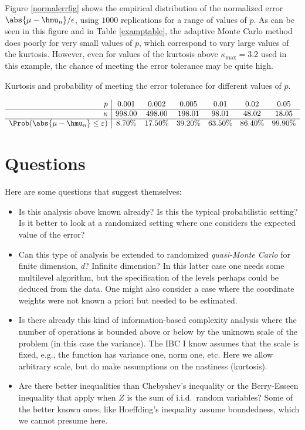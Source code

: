 \documentclass[12pt]{amsart}
\begin{document}
Figure \ref{normalerrfig} shows the empirical distribution of the normalized error $\abs{\mu-\hmu_n}/\epsilon$, using $1000$ replications for a range of values of $p$.  As can be seen in this figure and in Table \ref{examptable}, the adaptive Monte Carlo method does poorly for very small values of $p$, which correspond to vary large values of the kurtosis.  However, even for values of the kurtosis above $\kappa_{\max}=3.2$ used in this example, the chance of meeting the error tolerance may be quite high.

\begin{table}
\caption{Kurtosis and probability of meeting the error tolerance for different values of $p$. \label{examptable}}
\[
\begin{array}{r|ccccccccccc}
p &   0.001 &    0.002 &    0.005 &     0.01 &     0.02 &     0.05 \\
\hline
\kappa &  998.00 &   498.00 &   198.01 &    98.01 &    48.02 &    18.05 \\
\hline
\Prob(\abs{\mu-\hmu_n} \le \varepsilon) &    8.70\% &    17.50\% &    39.20\% &    63.50\% &    86.40\% &    99.90\% \\
\end{array}
\]
\end{table}


\section{Questions}

Here are some questions that suggest themselves:

\begin{itemize}

\item Is this analysis above known already?  Is this the typical probabilistic setting?  Is it better to look at a randomized setting where one considers the expected value of the error?

\item Can this type of analysis be extended to randomized \emph{quasi-Monte Carlo} for finite dimension, $d$?  Infinite dimension?  In this latter case one needs some multilevel algorithm, but the specification of the levels perhaps could be deduced from the data.  One might also consider a case where the coordinate weights were not known a priori but needed to be estimated.

\item Is there already this kind of information-based complexity analysis where the number of operations is bounded above or below by the unknown scale of the problem (in this case the variance).  The IBC I know assumes that the scale is fixed, e.g., the function has variance one, norm one, etc.  Here we allow arbitrary scale, but do make assumptions on the nastiness (kurtosis).

\item Are there better inequalities than Chebyshev's inequality or the Berry-Esseen inequality that apply when $Z$ is the sum of i.i.d.\ random variables?  Some of the better known ones, like Hoeffding's inequality assume boundedness, which we cannot presume here.

\end{itemize}
\end{document}
